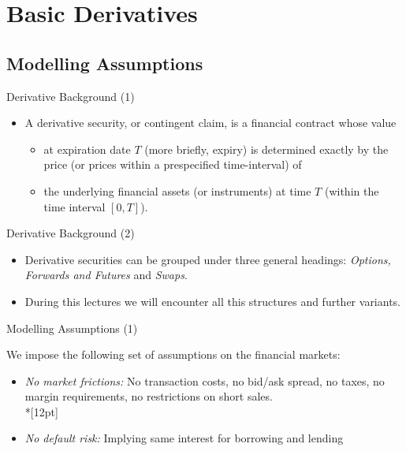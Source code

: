 
\section{Basic Derivatives}

\begin{frame}
    \frametitle{}
\vspace{0cm}
\begin{center}
\end{center}
\end{frame}


\subsection{Modelling Assumptions}



{Derivative Background (1)}

\begin{itemize}
  \item A derivative security, or contingent claim, is a financial
contract whose value
\begin{itemize}
\item at expiration date $T$ (more briefly, expiry)
is determined exactly  by the price (or
prices within a prespecified time-interval) of
\item the underlying
financial assets (or instruments) at time $T$ (within the time
interval $[0,T]$).
\end{itemize}
\end{itemize}



{Derivative Background (2)}
\begin{itemize}
  \item Derivative securities can be grouped under three general headings:
{\it Options, Forwards and Futures} and {\it Swaps}.
\item During this lectures we will encounter all this structures and further variants.
\end{itemize}



{ Modelling Assumptions (1)}

 We impose the following set of assumptions on the financial
markets:
\begin{itemize}
\item<1-> {\it No market frictions: } No transaction costs, no bid/ask
spread, no taxes,
 no margin requirements, no restrictions on short sales.\\*[12pt]
\item<2-> {\it No default risk:} Implying same interest for borrowing
and lending
\end{itemize}





